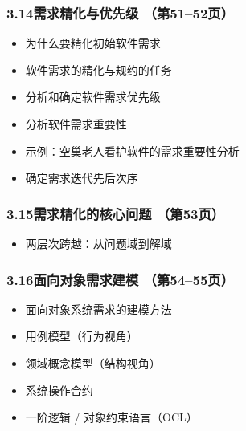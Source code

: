 \documentclass[12pt,a4paper]{ctexart}
\begin{document}
\subsubsection{3.14\quad 需求精化与优先级 \hfill（第51--52页）}
\begin{itemize}
    \item 为什么要精化初始软件需求
    \item 软件需求的精化与规约的任务
    \item 分析和确定软件需求优先级
    \item 分析软件需求重要性
    \item 示例：空巢老人看护软件的需求重要性分析
    \item 确定需求迭代先后次序
\end{itemize}

\subsubsection{3.15\quad 需求精化的核心问题 \hfill（第53页）}
\begin{itemize}
    \item 两层次跨越：从问题域到解域
\end{itemize}

\subsubsection{3.16\quad 面向对象需求建模 \hfill（第54--55页）}
\begin{itemize}
    \item 面向对象系统需求的建模方法
    \item 用例模型（行为视角）
    \item 领域概念模型（结构视角）
    \item 系统操作合约
    \item 一阶逻辑 / 对象约束语言（OCL）
\end{itemize}
\end{document}
